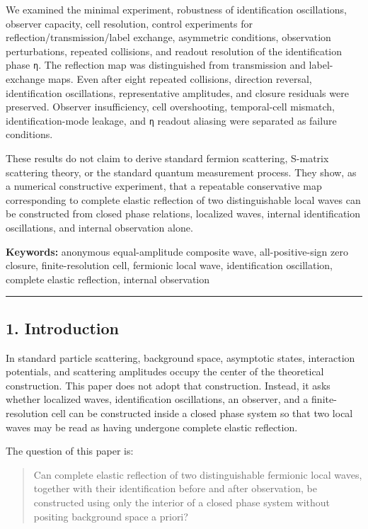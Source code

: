 \documentclass[
  a4paper,
]{article}
\begin{document}
We examined the minimal experiment, robustness of identification
oscillations, observer capacity, cell resolution, control experiments
for reflection/transmission/label exchange, asymmetric conditions,
observation perturbations, repeated collisions, and readout resolution
of the identification phase \texttt{η}. The reflection map was
distinguished from transmission and label-exchange maps. Even after
eight repeated collisions, direction reversal, identification
oscillations, representative amplitudes, and closure residuals were
preserved. Observer insufficiency, cell overshooting, temporal-cell
mismatch, identification-mode leakage, and \texttt{η} readout aliasing
were separated as failure conditions.

These results do not claim to derive standard fermion scattering,
S-matrix scattering theory, or the standard quantum measurement process.
They show, as a numerical constructive experiment, that a repeatable
conservative map corresponding to complete elastic reflection of two
distinguishable local waves can be constructed from closed phase
relations, localized waves, internal identification oscillations, and
internal observation alone.

\textbf{Keywords:} anonymous equal-amplitude composite wave,
all-positive-sign zero closure, finite-resolution cell, fermionic local
wave, identification oscillation, complete elastic reflection, internal
observation

\begin{center}\rule{0.5\linewidth}{0.5pt}\end{center}

\subsection{1. Introduction}\label{introduction}

In standard particle scattering, background space, asymptotic states,
interaction potentials, and scattering amplitudes occupy the center of
the theoretical construction. This paper does not adopt that
construction. Instead, it asks whether localized waves, identification
oscillations, an observer, and a finite-resolution cell can be
constructed inside a closed phase system so that two local waves may be
read as having undergone complete elastic reflection.

The question of this paper is:

\begin{quote}
Can complete elastic reflection of two distinguishable fermionic local
waves, together with their identification before and after observation,
be constructed using only the interior of a closed phase system without
positing background space a priori?
\end{quote}
\end{document}

